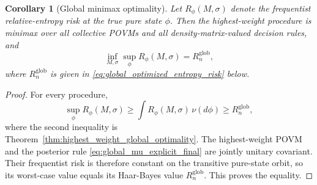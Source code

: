 \documentclass[journal]{IEEEtran}
\newtheorem{corollary}[theorem]{Corollary}
\begin{document}
\begin{corollary}[Global minimax optimality]
\label{cor:global_minimax_optimality}
Let \(R_\phi(M,\sigma)\) denote the frequentist relative-entropy risk at the
true pure state \(\phi\).  Then the highest-weight procedure is minimax over all
collective POVMs and all density-matrix-valued decision rules, and
\begin{equation}
    \inf_{M,\sigma}\sup_\phi R_\phi(M,\sigma)
    =
    R_n^{\mathrm{glob}},
    \label{eq:global_minimax_value}
\end{equation}
where \(R_n^{\mathrm{glob}}\) is given in
\eqref{eq:global_optimized_entropy_risk} below.
\end{corollary}

\begin{proof}
For every procedure,
\[
    \sup_\phi R_\phi(M,\sigma)
    \ge
    \int R_\phi(M,\sigma)\,\nu(d\phi)
    \ge
    R_n^{\mathrm{glob}},
\]
where the second inequality is Theorem~\ref{thm:highest_weight_global_optimality}.
The highest-weight POVM and the posterior rule
\eqref{eq:global_mu_explicit_final} are jointly unitary covariant.  Their
frequentist risk is therefore constant on the transitive pure-state orbit, so
its worst-case value equals its Haar-Bayes value
\(R_n^{\mathrm{glob}}\).  This proves the equality.
\end{proof}
\end{document}

